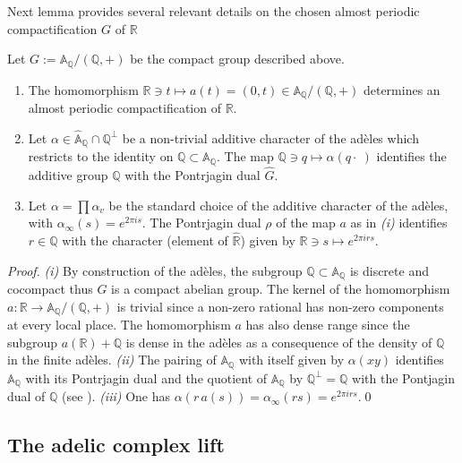 \documentclass[graybox, envcountsect%
]{svmult}
\def\A{{\mathbb A}}
\def\Q{{\mathbb Q}}
\def\R{{\mathbb R}}
\def\no{\noindent}
\begin{document}
   \no Next lemma provides several relevant details on the chosen almost periodic compactification $G$ of $\R$
   
\begin{lemma}\label{adelicomp} Let $G:=\A_\Q/(\Q,+)$ be the compact group described above. \begin{enumerate}
\item[(i)] The homomorphism $\R\ni t\mapsto a(t)=(0,t)\in \A_\Q/(\Q,+)$ determines an almost periodic compactification of $\R$.
\item[(ii)] Let $\alpha \in \hat \A_\Q\cap \Q^\perp$ be a non-trivial additive character of the ad\`eles which restricts to the identity on $\Q\subset \A_\Q$. The map $\Q\ni q\mapsto \alpha(q\cdot~)$ identifies the additive group $\Q$ with the Pontrjagin dual $\hat G$.
\item[(iii)] Let $\alpha=\prod \alpha_v$ be the standard choice of the additive character of the ad\`eles, with $\alpha_\infty(s)=e^{2 \pi i s}$. The  Pontrjagin dual $\rho$ of the map $a$ as in {\it (i)} identifies $r\in\Q$ with the character 
 (element of $\hat\R$) given by $\R\ni s\mapsto e^{2 \pi i rs}$.	
 \end{enumerate}
\end{lemma}
\begin{proof} {\it (i)} By construction of the ad\`eles, the subgroup $\Q\subset \A_\Q$ is discrete and cocompact thus $G$ is a compact abelian group. The kernel of the homomorphism $a:\R\to \A_\Q/(\Q,+)$ is trivial since a non-zero rational has non-zero components at every local place. The homomorphism $a$ has also dense range since  the subgroup $a(\R)+\Q$ is dense in the ad\`eles as a consequence of the density of $\Q$ in the finite ad\`eles. \newline
{\it (ii)} The pairing of $\A_\Q$ with itself given by  $\alpha(xy)$ identifies $\A_\Q$ with its Pontrjagin dual and the quotient of $\A_\Q$ by $\Q^\perp=\Q$ with the Pontjagin dual of $\Q$ (see \cite{weilbasic}).\newline
{\it (iii)} One has $\alpha(r\,a(s))=\alpha_\infty(rs)=e^{2 \pi i r s}$.\qed\end{proof} 


\subsection{The adelic complex lift}\label{subsec:5.2}
\end{document}

